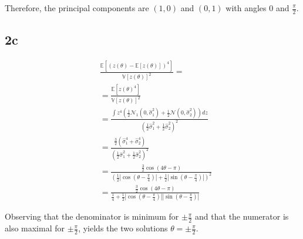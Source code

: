 Therefore, the principal components are $(1, 0)$ and $(0, 1)$ with angles $0$ and $\frac{\pi}{2}$.
\subsection*{2c}

\def\E{{\mathbb{E}}}

\begin{align}
    &\frac{\E[(z(\theta) - \E[z(\theta)])^4]}{\mathbb{V}[z(\theta)]^2} = \\
    & = \frac{\E[z(\theta)^4]}{\mathbb{V}[z(\theta)]^2} \\
    & = \frac{\int z^4 \left(
    \frac{1}{2} \mathcal{N}_1(0, \hat \sigma_1^2) + \frac{1}{2} \mathcal{N}(0, \hat \sigma_2^2) \right) dz
    }{(\frac{1}{2} \hat \sigma_1^2 + \frac{1}{2}\hat \sigma_2^2)^2} \\
    & = \frac{
        \frac{3}{2} \left(\hat \sigma_1^4 + \hat \sigma_2^4\right)
    }{\left(\frac{1}{2} \hat \sigma_1^2 + \frac{1}{2}\hat \sigma_2^2 \right)^2} \\
    & = \frac{\frac{3}{2} \cos(4\theta - \pi)
    }{\left(\frac{1}{2} \left|\cos\left(\theta -\frac{\pi}{4}\right) \right| + \frac{1}{2} \left|\sin\left(\theta -\frac{\pi}{4} \right)\right|\right)^2} \\
    & = \frac{\frac{3}{2} \cos(4\theta - \pi)
    }{\frac{1}{4} + \frac{1}{2}\left|\cos\left(\theta -\frac{\pi}{4}\right) \right| \left|\sin\left(\theta -\frac{\pi}{4} \right)\right|}
\end{align}

Observing that the denominator is minimum for $\pm \frac{\pi}{2}$ and that the
numerator is also maximal for $\pm \frac{\pi}{2}$, yields the two solutions
$\theta = \pm \frac{\pi}{2}$.

